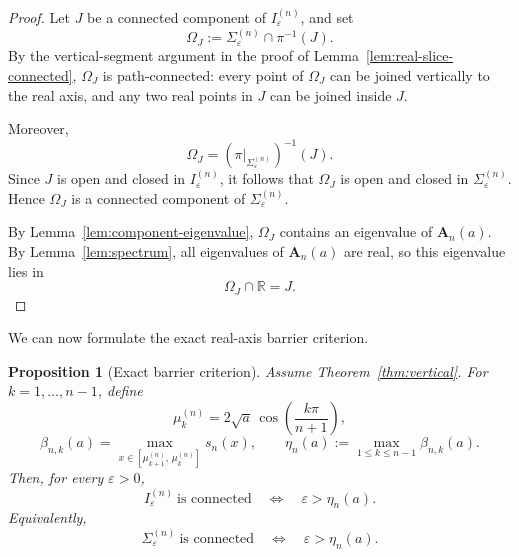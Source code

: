 \documentclass[11pt]{article}
\numberwithin{equation}{section}
\newtheorem{proposition}[theorem]{Proposition}
\newcommand{\R}{\mathbb R}
\newcommand{\A}{\mathbf A}
\begin{document}
\begin{proof}
Let \(J\) be a connected component of \(I_\varepsilon^{(n)}\), and set
\[
\Omega_J:=\Sigma_\varepsilon^{(n)}\cap \pi^{-1}(J).
\]
By the vertical-segment argument in the proof of
Lemma~\ref{lem:real-slice-connected}, \(\Omega_J\) is path-connected: every point of
\(\Omega_J\) can be joined vertically to the real axis, and any two real points in \(J\)
can be joined inside \(J\).

Moreover,
\[
\Omega_J=(\pi|_{\Sigma_\varepsilon^{(n)}})^{-1}(J).
\]
Since \(J\) is open and closed in \(I_\varepsilon^{(n)}\), it follows that \(\Omega_J\) is open
and closed in \(\Sigma_\varepsilon^{(n)}\).  Hence \(\Omega_J\) is a connected component of
\(\Sigma_\varepsilon^{(n)}\).

By Lemma~\ref{lem:component-eigenvalue}, \(\Omega_J\) contains an eigenvalue of
\(\A_n(a)\).  By Lemma~\ref{lem:spectrum}, all eigenvalues of \(\A_n(a)\) are real, so
this eigenvalue lies in
\[
\Omega_J\cap\R = J.
\]
\end{proof}

We can now formulate the exact real-axis barrier criterion.

\begin{proposition}[Exact barrier criterion]\label{prop:barrier}
Assume Theorem~\ref{thm:vertical}.  For \(k=1,\dots,n-1\), define
\[
\mu_k^{(n)}=2\sqrt a\,\cos\!\left(\frac{k\pi}{n+1}\right),
\]
\[
\beta_{n,k}(a)
=
\max_{x\in[\mu_{k+1}^{(n)},\,\mu_k^{(n)}]} s_n(x),
\qquad
\eta_n(a):=\max_{1\le k\le n-1}\beta_{n,k}(a).
\]
Then, for every \(\varepsilon>0\),
\[
I_\varepsilon^{(n)}\ \text{is connected}
\quad\Longleftrightarrow\quad
\varepsilon>\eta_n(a).
\]
Equivalently,
\[
\Sigma_\varepsilon^{(n)}\ \text{is connected}
\quad\Longleftrightarrow\quad
\varepsilon>\eta_n(a).
\]
\end{proposition}
\end{document}
